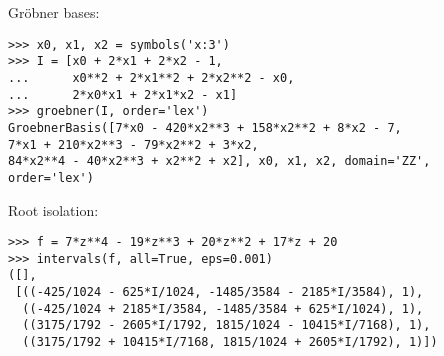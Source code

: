 \noindent Gr\"{o}bner bases:
\begin{verbatim}
>>> x0, x1, x2 = symbols('x:3')
>>> I = [x0 + 2*x1 + 2*x2 - 1,
...      x0**2 + 2*x1**2 + 2*x2**2 - x0,
...      2*x0*x1 + 2*x1*x2 - x1]
>>> groebner(I, order='lex')
GroebnerBasis([7*x0 - 420*x2**3 + 158*x2**2 + 8*x2 - 7,
7*x1 + 210*x2**3 - 79*x2**2 + 3*x2,
84*x2**4 - 40*x2**3 + x2**2 + x2], x0, x1, x2, domain='ZZ', order='lex')
\end{verbatim}

\noindent Root isolation:
\begin{verbatim}
>>> f = 7*z**4 - 19*z**3 + 20*z**2 + 17*z + 20
>>> intervals(f, all=True, eps=0.001)
([],
 [((-425/1024 - 625*I/1024, -1485/3584 - 2185*I/3584), 1),
  ((-425/1024 + 2185*I/3584, -1485/3584 + 625*I/1024), 1),
  ((3175/1792 - 2605*I/1792, 1815/1024 - 10415*I/7168), 1),
  ((3175/1792 + 10415*I/7168, 1815/1024 + 2605*I/1792), 1)])
\end{verbatim}
